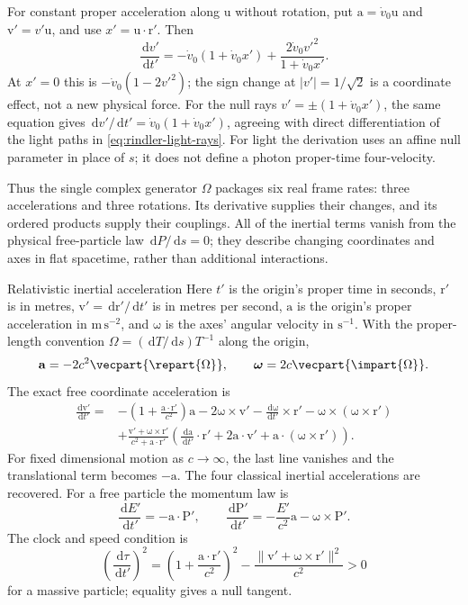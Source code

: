 \documentclass[11pt]{article}
\newcommand{\pv}[1]{{#1}}
\newcommand{\pvGreek}[1]{{#1}}
\newcommand{\vstyle}[1]{{\bm{\mathrm{#1}}}}
\newcommand{\pP}{\pv{P}}
\newcommand{\pT}{\pv{T}}
\newcommand{\pvOmega}{\pvGreek{\Omega}}
\numberwithin{equation}{section}
\newcommand{\dotprod}{\cdot}
\newcommand{\br}{\vstyle{r}}
\newcommand{\bv}{\vstyle{v}}
\newcommand{\bu}{\vstyle{u}}
\newcommand{\ba}{\vstyle{a}}
\newcommand{\bp}{\vstyle{P}}
\newcommand{\dd}{\,\mathrm d}
\begin{document}
For constant proper acceleration along $\bu$ without rotation,
put $\ba=\dot v_0\bu$ and $\bv'=v'\bu$, and use
$x'=\bu\dotprod\br'$. Then
\begin{equation}
 \frac{\dd v'}{\dd t'}
 =-\dot v_0(1+\dot v_0x')
  +\frac{2\dot v_0v'^2}{1+\dot v_0x'}.
 \label{eq:rindler-free-coordinate-acceleration}
\end{equation}
At $x'=0$ this is $-\dot v_0(1-2v'^2)$; the sign change at
$|v'|=1/\sqrt2$ is a coordinate effect, not a new physical force.
For the null rays $v'=\pm(1+\dot v_0x')$, the same equation gives
$\dd v'/\dd t'=\dot v_0(1+\dot v_0x')$, agreeing with direct
differentiation of the light paths in \eqref{eq:rindler-light-rays}.
For light the derivation uses an affine null parameter in place of $s$;
it does not define a photon proper-time four-velocity.

Thus the single complex generator $\pvOmega$ packages six real frame
rates: three accelerations and three rotations. Its derivative supplies
their changes, and its ordered products supply their couplings. All
of the inertial terms vanish from the physical free-particle law
$\dd\pP/\dd s=0$; they describe changing coordinates and axes in flat
spacetime, rather than additional interactions.

\begin{SIunits}{Relativistic inertial acceleration}
Here $t'$ is the origin's proper time in seconds, $\br'$ is in metres,
$\bv'=\dd\br'/\dd t'$ is in metres per second,
$\ba$ is the origin's proper acceleration in $\mathrm{m\,s^{-2}}$,
and $\vstyle{\omega}$ is the axes' angular velocity in $\mathrm{s^{-1}}$.
With the proper-length convention
$\pvOmega=(\dd\pT/\dd s)\pT^{-1}$ along the origin,
\[
 \ba=-2c^2\vecpart{\repart{\pvOmega}},\qquad
 \vstyle{\omega}=2c\vecpart{\impart{\pvOmega}}.
\]
The exact free coordinate acceleration is
\[
 \begin{aligned}
 \frac{\dd\bv'}{\dd t'}={}&
 -\left(1+\frac{\ba\dotprod\br'}{c^2}\right)\ba
 -2\vstyle{\omega}\times\bv'
 -\frac{\dd\vstyle{\omega}}{\dd t'}\times\br'
 -\vstyle{\omega}\times(\vstyle{\omega}\times\br')\\
 &+\frac{\bv'+\vstyle{\omega}\times\br'}{c^2+\ba\dotprod\br'}
 \left(\frac{\dd\ba}{\dd t'}\dotprod\br'
       +2\ba\dotprod\bv'
       +\ba\dotprod(\vstyle{\omega}\times\br')\right).
 \end{aligned}
\]
For fixed dimensional motion as $c\to\infty$, the last line vanishes
and the translational term becomes $-\ba$. The four classical inertial
accelerations are recovered. For a free particle the momentum law is
\[
 \frac{\dd E'}{\dd t'}=-\ba\dotprod\bp',\qquad
 \frac{\dd\bp'}{\dd t'}=-\frac{E'}{c^2}\ba
                         -\vstyle{\omega}\times\bp'.
\]
The clock and speed condition is
\[
 \left(\frac{\dd\tau}{\dd t'}\right)^2
 =\left(1+\frac{\ba\dotprod\br'}{c^2}\right)^2
 -\frac{\lVert\bv'+\vstyle{\omega}\times\br'\rVert^2}{c^2}>0
\]
for a massive particle; equality gives a null tangent.
\end{SIunits}
\end{document}
